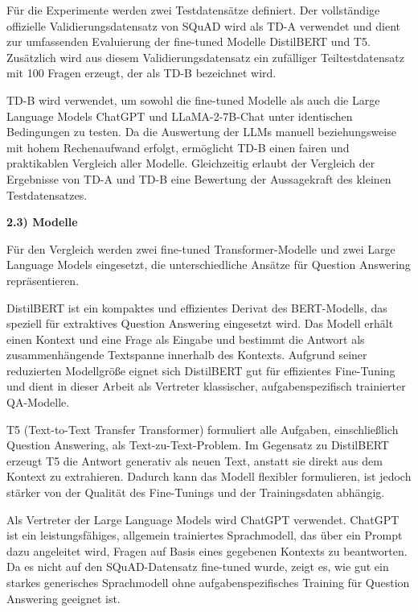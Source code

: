 \documentclass[12pt,oneside]{article}
\begin{document}
Für die Experimente werden zwei Testdatensätze definiert. Der
vollständige offizielle Validierungsdatensatz von SQuAD wird als TD-A
verwendet und dient zur umfassenden Evaluierung der fine-tuned Modelle
DistilBERT und T5. Zusätzlich wird aus diesem Validierungsdatensatz ein
zufälliger Teiltestdatensatz mit 100 Fragen erzeugt, der als TD-B
bezeichnet wird.

TD-B wird verwendet, um sowohl die fine-tuned Modelle als auch die Large
Language Models ChatGPT und LLaMA-2-7B-Chat unter identischen
Bedingungen zu testen. Da die Auswertung der LLMs manuell
beziehungsweise mit hohem Rechenaufwand erfolgt, ermöglicht TD-B einen
fairen und praktikablen Vergleich aller Modelle. Gleichzeitig erlaubt
der Vergleich der Ergebnisse von TD-A und TD-B eine Bewertung der
Aussagekraft des kleinen Testdatensatzes.

\textbf{2.3) Modelle}

Für den Vergleich werden zwei fine-tuned Transformer-Modelle und zwei
Large Language Models eingesetzt, die unterschiedliche Ansätze für
Question Answering repräsentieren.

DistilBERT \citep{sanh2019distilbert} ist ein kompaktes und effizientes Derivat des BERT-Modells,
das speziell für extraktives Question Answering eingesetzt wird. Das
Modell erhält einen Kontext und eine Frage als Eingabe und bestimmt die
Antwort als zusammenhängende Textspanne innerhalb des Kontexts. Aufgrund
seiner reduzierten Modellgröße eignet sich DistilBERT gut für
effizientes Fine-Tuning und dient in dieser Arbeit als Vertreter
klassischer, aufgabenspezifisch trainierter QA-Modelle.

T5 (Text-to-Text Transfer Transformer) \citep{raffel2020t5} formuliert alle Aufgaben,
einschließlich Question Answering, als Text-zu-Text-Problem. Im
Gegensatz zu DistilBERT erzeugt T5 die Antwort generativ als neuen Text,
anstatt sie direkt aus dem Kontext zu extrahieren. Dadurch kann das
Modell flexibler formulieren, ist jedoch stärker von der Qualität des
Fine-Tunings und der Trainingsdaten abhängig.

Als Vertreter der Large Language Models wird ChatGPT \citep{openai2023chatgpt} verwendet. ChatGPT
ist ein leistungsfähiges, allgemein trainiertes Sprachmodell, das über
ein Prompt dazu angeleitet wird, Fragen auf Basis eines gegebenen
Kontexts zu beantworten. Da es nicht auf den SQuAD-Datensatz fine-tuned
wurde, zeigt es, wie gut ein starkes generisches Sprachmodell ohne
aufgabenspezifisches Training für Question Answering geeignet ist.
\end{document}
